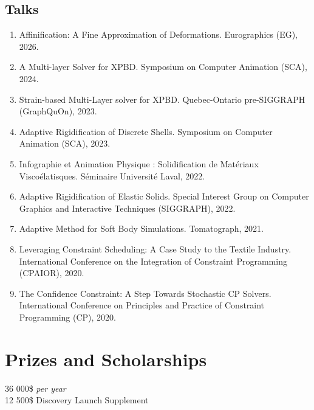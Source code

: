 \documentclass[10pt]{article} %
\begin{document}
\subsection{Talks}
\begin{enumerate}
  \setcounter{enumi}{\value{listCounter}}
  \item Affinification: A Fine Approximation of Deformations. Eurographics (EG), 2026. 
  \item A Multi-layer Solver for XPBD. Symposium on Computer Animation (SCA), 2024. 
  \item Strain-based Multi-Layer solver for XPBD. Quebec-Ontario pre-SIGGRAPH (GraphQuOn), 2023.
  \item Adaptive Rigidification of Discrete Shells. Symposium on Computer Animation (SCA), 2023. 
  \item Infographie et Animation Physique : Solidification de Matériaux Viscoélatisques.  Séminaire Université Laval, 2022.
  \item Adaptive Rigidification of Elastic Solids. Special Interest Group on Computer Graphics and Interactive Techniques (SIGGRAPH), 2022. 
  \item Adaptive Method for Soft Body Simulations. Tomatograph, 2021.
  \item  Leveraging Constraint Scheduling: A Case Study to the Textile Industry. International Conference on the Integration of Constraint Programming (CPAIOR), 2020.
  \item The Confidence Constraint: A Step Towards Stochastic CP Solvers. International Conference on Principles and Practice of Constraint Programming (CP), 2020.
\end{enumerate}



\section{Prizes and Scholarships}

{
 36 000\$ \textit{per year} \\
 12 500\$ Discovery Launch Supplement \\
}
\end{document}
